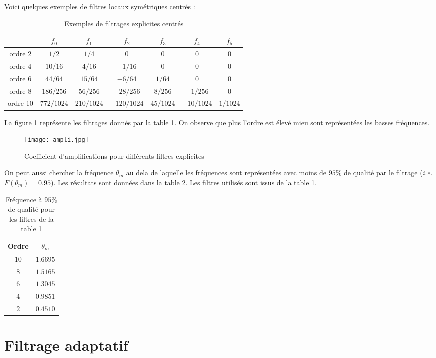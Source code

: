 \documentclass[10pt,a4paper]{article}
\begin{document}
Voici quelques exemples de filtres locaux symétriques centrés :


\begin{table}[ht]
\begin{center}
\begin{tabular}{c|cccccc}
& $f_0$ & $f_1$ & $f_2$ & $f_3$ & $f_4$ & $f_5$ \\
\hline
\hline
ordre 2 & $1/2$ & $1/4$ & $0$ & $0$ & $0$ & $0$\\
\hline
ordre 4 & $10/16$ & $4/16$ & $-1/16$ & $0$ & $0$ & $0$ \\
\hline
ordre 6 & $44/64$ & $15/64$ & $-6/64$ & $1/64$ & $0$ & $0$ \\
\hline
ordre 8 & $186/256$ & $56/256$ & $-28/256$ & $8/256$ & $-1/256$ & $0$ \\
\hline
ordre 10 & $772/1024$ & $210/1024$ & $-120/1024$ & $45/1024$ & $-10/1024$ & $1/1024$ \\
\end{tabular}
\caption{Exemples de filtrages explicites centrés}
\label{tab:redonnet}
\end{center}
\end{table}

La figure \ref{fig:ampli} représente les filtrages donnés par la table \ref{tab:redonnet}. On observe que plus l'ordre est élevé mieu sont représentées les basses fréquences.

\begin{figure}
\begin{center}
\texttt{[image: ampli.jpg]}
\caption{Coefficient d'amplifications pour différents filtres explicites}
\label{fig:ampli}
\end{center}
\end{figure}

On peut aussi chercher la fréquence $\theta_m$ au dela de laquelle les fréquences sont représentées avec moins de $95 \%$ de qualité par le filtrage (\textit{i.e.} $F(\theta_m)=0.95$). Les résultats sont données dans la table \ref{tab:qualite freq}. Les filtres utilisés sont issus de la table \ref{tab:redonnet}.

\begin{table}[ht]
\begin{center}
\begin{tabular}{c|c}
Ordre & $\theta_m$ \\
\hline
\hline
$10$ & $1.6695$ \\
$8$  & $1.5165$ \\
$6$  & $1.3045$ \\
$4$  & $0.9851$ \\
$2$  & $0.4510$ 
\end{tabular}
\caption{Fréquence à $95 \%$ de qualité pour les filtres de la table \ref{tab:redonnet}}
\label{tab:qualite freq}
\end{center}
\end{table}


\section{Filtrage adaptatif}






\end{document}
